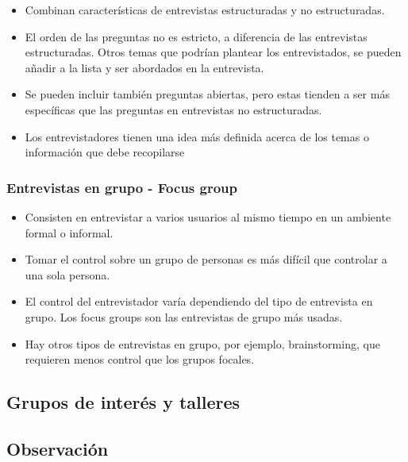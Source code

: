 \documentclass[12pt, twoside, openright]{report} %
\begin{document}
        \begin{itemize}
        
        \item
          Combinan características de entrevistas estructuradas y no
          estructuradas.
        \item
          El orden de las preguntas no es estricto, a diferencia de las
          entrevistas estructuradas. Otros temas que podrían plantear
          los entrevistados, se pueden añadir a la lista y ser abordados
          en la entrevista.
        \item
          Se pueden incluir también preguntas abiertas, pero estas
          tienden a ser más específicas que las preguntas en entrevistas
          no estructuradas.
        \item
          Los entrevistadores tienen una idea más definida acerca de los
          temas o información que debe recopilarse
        \end{itemize}

\subsubsection{Entrevistas en grupo - Focus group}

        \begin{itemize}
        
        \item
          Consisten en entrevistar a varios usuarios al mismo tiempo en
          un ambiente formal o informal.
        \item
          Tomar el control sobre un grupo de personas es más difícil que
          controlar a una sola persona.
        \item
          El control del entrevistador varía dependiendo del tipo de
          entrevista en grupo. Los focus groups son las entrevistas de
          grupo más usadas.
        \item
          Hay otros tipos de entrevistas en grupo, por ejemplo,
          brainstorming, que requieren menos control que los grupos
          focales.
        \end{itemize}
\subsection{Grupos de interés y talleres}
\subsection{Observación}
\end{document}
